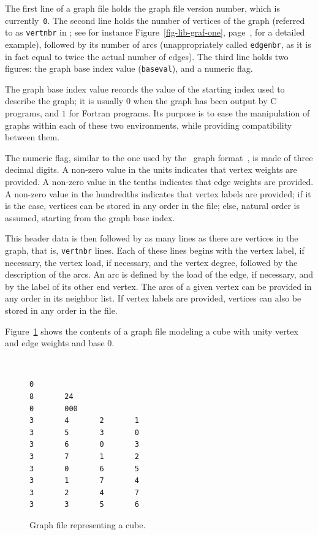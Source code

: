 The first line of a graph file holds the graph file version number,
which is currently~\texttt{0}. The second line holds the number of
vertices of the graph (referred to as \texttt{vertnbr} in \libscotch; see
for instance Figure~\ref{fig-lib-graf-one},
page~\pageref{fig-lib-graf-one}, for a detailed example), followed by
its number of arcs (unappropriately called \texttt{edgenbr}, as it is in
fact equal to twice the actual number of edges). The third line holds
two figures: the graph base index value (\texttt{baseval}), and a numeric
flag.

The graph base index value records the value of the starting index
used to describe the graph; it is usually $0$ when the graph has been
output by C programs, and $1$ for Fortran programs. Its purpose is to
ease the manipulation of graphs within each of these two environments,
while providing compatibility between them.

The numeric flag, similar to the one used by the \chaco\ graph
format~\cite{hele93c}, is made of three decimal digits.
A non-zero value in the units indicates that vertex weights are provided.
A non-zero value in the tenths indicates that edge weights are provided.
A non-zero value in the hundredths indicates that vertex labels are provided;
if it is the case, vertices can be stored in any order in the file; else,
natural order is assumed, starting from the graph base index.

This header data is then followed by as many lines as there are
vertices in the graph, that is, \texttt{vertnbr} lines. Each of these
lines begins with the vertex label, if necessary, the vertex load, if
necessary, and the vertex degree, followed by the description of the
arcs. An arc is defined by the load of the edge, if necessary, and by
the label of its other end vertex.
The arcs of a given vertex can be provided in any order in its
neighbor list. If vertex labels are provided, vertices can also be
stored in any order in the file.

Figure~\ref{fig-file-sgraph} shows the contents of a graph file
modeling a cube with unity vertex and edge weights and base $0$.

\begin{figure}[hbt]
\begin{center}
\begin{minipage}{7.3cm}
{\renewcommand{\baselinestretch}{1.05}
 \footnotesize \tt
\begin{verbatim}
0
8       24
0       000
3       4       2       1
3       5       3       0
3       6       0       3
3       7       1       2
3       0       6       5
3       1       7       4
3       2       4       7
3       3       5       6
\end{verbatim}}
\end{minipage}
\end{center}
\caption{Graph file representing a cube.}
\label{fig-file-sgraph}
\end{figure}


